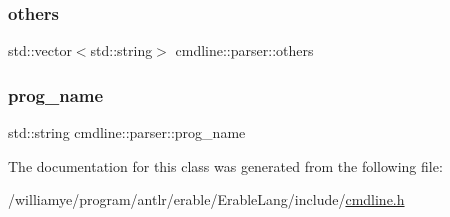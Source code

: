 \mbox{\label{classcmdline_1_1parser_aee5711cafc2f46c238fadf593e08e599}} 
\subsubsection{\texorpdfstring{others}{others}}
{\footnotesize\ttfamily std\+::vector$<$std\+::string$>$ cmdline\+::parser\+::others\hspace{0.3cm}{\ttfamily [private]}}

\mbox{\label{classcmdline_1_1parser_aacbd60921933dfc5606d22dbe1e30625}} 
\subsubsection{\texorpdfstring{prog\_name}{prog\_name}}
{\footnotesize\ttfamily std\+::string cmdline\+::parser\+::prog\+\_\+name\hspace{0.3cm}{\ttfamily [private]}}



The documentation for this class was generated from the following file\+:\begin{DoxyCompactItemize}
\item 
/williamye/program/antlr/erable/\+Erable\+Lang/include/\mbox{\hyperlink{cmdline_8h}{cmdline.\+h}}\end{DoxyCompactItemize}

